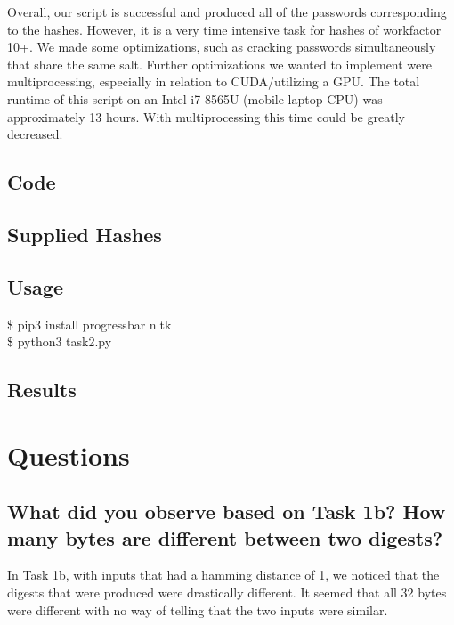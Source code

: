 \documentclass[11pt]{article}
\begin{document}
  Overall, our script is successful and produced all of the passwords
  corresponding to the hashes. However, it is a very time intensive task 
  for hashes of workfactor 10+. We made some optimizations, such as cracking 
  passwords simultaneously that share the same salt. Further optimizations we 
  wanted to implement were multiprocessing, especially in relation to CUDA/utilizing 
  a GPU. The total runtime of this script on an Intel i7-8565U (mobile laptop CPU) 
  was approximately 13 hours. With multiprocessing this time could be greatly 
  decreased.

  \subsection{Code}
    
  \subsection{Supplied Hashes}
    
  \subsection{Usage}
    {\tt\begin{tabbing}                                                                                                                                                                     
       \$ pip3 install progressbar nltk\\
       \$ python3 task2.py \\
      \end{tabbing}}
  \subsection{Results}
    

\pagebreak
\section{Questions}

  \subsection{What did you observe based on Task 1b? How many bytes are different
  between two digests?}

      In Task 1b, with inputs that had a hamming distance of 1, we noticed 
      that the digests that were produced were drastically different. 
      It seemed that all 32 bytes were different with no way of telling 
      that the two inputs were similar.
\end{document}
